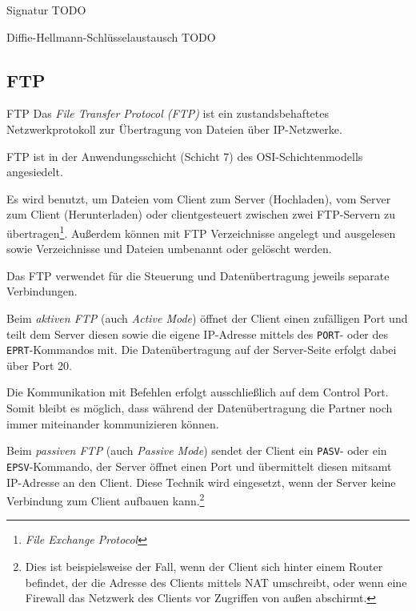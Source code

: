 \begin{defi}{Signatur}
    TODO
\end{defi}

\begin{bonus}{Diffie-Hellmann-Schlüsselaustausch}
    TODO
\end{bonus}

\subsection{FTP}

\begin{defi}{FTP}
    Das \emph{File Transfer Protocol (FTP)} ist ein zustandsbehaftetes Netzwerkprotokoll zur Übertragung von Dateien über IP-Netzwerke.

    FTP ist in der Anwendungsschicht (Schicht 7) des OSI-Schichtenmodells angesiedelt.

    Es wird benutzt, um Dateien vom Client zum Server (Hochladen), vom Server zum Client (Herunterladen) oder clientgesteuert zwischen zwei FTP-Servern zu übertragen\footnote{\emph{File Exchange Protocol}}.
    Außerdem können mit FTP Verzeichnisse angelegt und ausgelesen sowie Verzeichnisse und Dateien umbenannt oder gelöscht werden.

    Das FTP verwendet für die Steuerung und Datenübertragung jeweils separate Verbindungen.

    Beim \emph{aktiven FTP} (auch \emph{Active Mode}) öffnet der Client einen zufälligen Port und teilt dem Server diesen sowie die eigene IP-Adresse mittels des \texttt{PORT}- oder des \texttt{EPRT}-Kommandos mit.
    Die Datenübertragung auf der Server-Seite erfolgt dabei über Port 20.

    Die Kommunikation mit Befehlen erfolgt ausschließlich auf dem Control Port.
    Somit bleibt es möglich, dass während der Datenübertragung die Partner noch immer miteinander kommunizieren können.

    Beim \emph{passiven FTP} (auch \emph{Passive Mode}) sendet der Client ein \texttt{PASV}- oder ein \texttt{EPSV}-Kommando, der Server öffnet einen Port und übermittelt diesen mitsamt IP-Adresse an den Client.
    Diese Technik wird eingesetzt, wenn der Server keine Verbindung zum Client aufbauen kann.\footnote{Dies ist beispielsweise der Fall, wenn der Client sich hinter einem Router befindet, der die Adresse des Clients mittels NAT umschreibt, oder wenn eine Firewall das Netzwerk des Clients vor Zugriffen von außen abschirmt.}
\end{defi}

